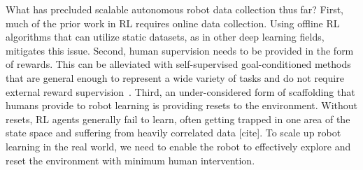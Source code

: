 What has precluded scalable autonomous robot data collection thus far?
First, much of the prior work in RL requires online data collection.
Using offline RL algorithms that can utilize static datasets, as in other deep learning fields, mitigates this issue.
Second, human supervision needs to be provided in the form of rewards.
This can be alleviated with self-supervised goal-conditioned methods that are general enough to represent a wide variety of tasks and do not require external reward supervision~\cite{schaul2015uva, andrychowicz2017her, nair2018rig}.
Third, an under-considered form of scaffolding that humans provide to robot learning is providing resets to the environment.
Without resets, RL agents generally fail to learn, often getting trapped in one area of the state space and suffering from heavily correlated data [cite].
To scale up robot learning in the real world, we need to enable the robot to effectively explore and reset the environment with minimum human intervention.

